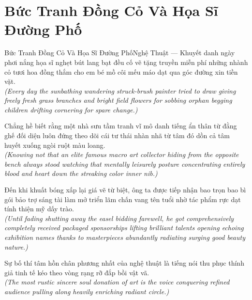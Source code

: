 \section{Bức Tranh Đồng Cỏ Và Họa Sĩ Đường Phố}
\begin{truyen}{Bức Tranh Đồng Cỏ Và Họa Sĩ Đường Phố}{Nghệ Thuật --- Khuyết danh}
 ngày phơi nắng họa sĩ nghẹt bút lang bạt đều cố vẽ tặng truyền miễn phí những nhành cỏ tươi hoa đồng thắm cho em bé mồ côi mếu máo dạt qua góc đường xin tiền vặt.\\[4pt]
\textit{(Every day the sunbathing wandering struck-brush painter tried to draw giving freely fresh grass branches and bright field flowers for sobbing orphan begging children drifting cornering for spare change.)}

Chẳng hề biết rằng một nhà sưu tầm tranh vĩ mô danh tiếng ẩn thân từ đằng ghế đối diện luôn đứng theo dõi cái tư thái nhàn nhã từ tâm đó dồn cả tâm huyết xuống ngòi ruột màu loang.\\[4pt]
\textit{(Knowing not that an elite famous macro art collector hiding from the opposite bench always stood watching that mentally leisurely posture concentrating entirely blood and heart down the streaking color inner nib.)}

Đến khi khuất bóng xấp lại giá vẽ từ biệt, ông ta được tiếp nhận bao trọn bao bì gói bảo trợ sáng tài làm mở triển lãm chấn vang tên tuổi nhờ tác phẩm rực dạt tính thiện mỹ dấy trào.\\[4pt]
\textit{(Until fading shutting away the easel bidding farewell, he got comprehensively completely received packaged sponsorships lifting brilliant talents opening echoing exhibition names thanks to masterpieces abundantly radiating surging good beauty nature.)}

\end{truyen}
\begin{baihoc}
  Sự bố thí tâm hồn chân phương nhất của nghệ thuật là tiếng nói thu phục thính giả tinh tế kéo theo vòng rạng rỡ đắp bồi vật vã.\\[4pt]
  \textit{(The most rustic sincere soul donation of art is the voice conquering refined audience pulling along heavily enriching radiant circle.)}
\end{baihoc}
